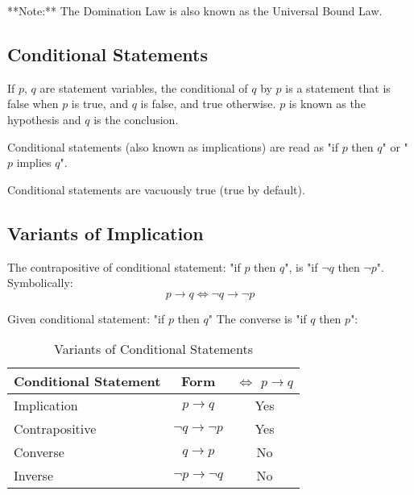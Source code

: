 \documentclass[11pt]{article}
\begin{document}
**Note:** The Domination Law is also known as the Universal Bound Law.
\starOFF

\subsection{Conditional Statements}

\begin{definition}[Conditional]\label{def:conditional}
    If $p$, $q$ are statement variables, the conditional of $q$ by $p$
    is a statement that is false when $p$ is true, and $q$ is false, and true
    otherwise. $p$ is known as the hypothesis and $q$ is the conclusion.
\end{definition}

Conditional statements (also known as implications) are read as
"if $p$ then $q$" or "$p$ implies $q$".

Conditional statements are vacuously true (true by default).

\subsection{Variants of Implication}

\begin{definition}[Contrapositive]\label{def:contrapositive}
    The contrapositive of conditional statement: "if $p$ then $q$",
    is "if $\neg q$ then $\neg p$". Symbolically:
    \begin{equation}
        p \to q \iff \neg q \to \neg p
    \end{equation}
\end{definition}

\begin{definition}[Converse]\label{def:converse}
    Given conditional statement: "if $p$ then $q$"
    The converse is "if $q$ then $p$":
\end{definition}

\begin{table}[!htbp]
    \centering
    \begin{tabular}{ l c c}
        \toprule
        Conditional Statement & Form                & $\iff$ $p \to q$ \\
        \midrule
        Implication         & $p \to q$             & Yes \\
        Contrapositive      & $\neg q \to \neg p$   & Yes \\
        Converse            & $q \to p$             & No \\
        Inverse             & $\neg p \to \neg q$   & No \\
        \bottomrule
    \end{tabular}
    \label{tab:tbl-implication-variants}
    \caption{Variants of Conditional Statements}
\end{table}
\end{document}
